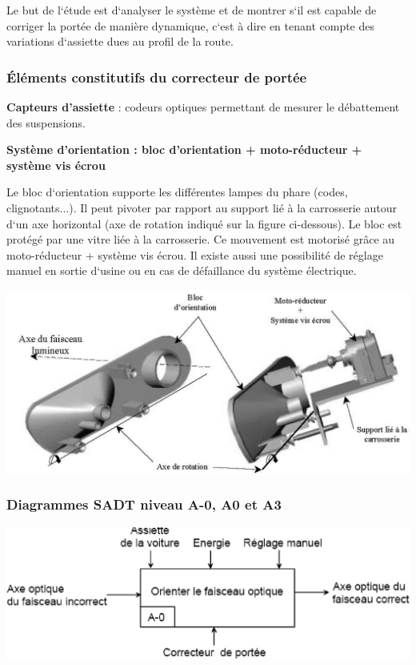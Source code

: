 \documentclass[10pt,fleqn]{article} %
\begin{document}
\begin{multicols}{2}
       Le but de l‘étude est d‘analyser le système et de montrer s‘il est
capable de corriger la portée
de manière dynamique, c‘est à dire en tenant compte des variations d‘assiette
dues au profil de la
route.

\subsubsection*{Éléments constitutifs du correcteur de portée}

\textbf{Capteurs d’assiette} : codeurs optiques permettant de mesurer le
débattement des suspensions.

\textbf{Système d’orientation : bloc d’orientation + moto-réducteur + système
vis écrou}

Le bloc d‘orientation supporte les différentes lampes du phare (codes,
clignotants...). Il peut pivoter
par rapport au support lié à la carrosserie autour d‘un axe horizontal (axe de
rotation indiqué sur la
figure ci-dessous). Le bloc est protégé par une vitre liée à la carrosserie. Ce
mouvement est motorisé
grâce au moto-réducteur + système vis écrou. Il existe aussi une possibilité de
réglage manuel en
sortie d‘usine ou en cas de défaillance du système électrique.

\begin{center}
 \includegraphics[width=.9\linewidth]{images/image1_2}
\end{center}

\subsubsection*{Diagrammes SADT niveau A-0, A0 et A3}
\begin{center}
 \includegraphics[width=.9\linewidth]{images/image1_3}
\end{center}


\end{multicols}
\end{document}
